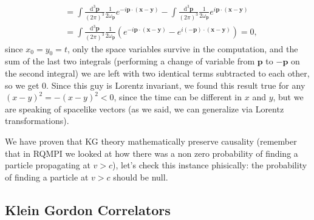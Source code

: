 \begin{enumerate}
\[\begin{aligned}
                              & = \int \frac{\mathrm{d}^3 \mathbf{p}}{(2\pi)^3} \frac{1}{2\omega_{\mathbf{p}}} e^{-i \mathbf{p} \cdot (\mathbf{x}-\mathbf{y})} - \int \frac{\mathrm{d}^3 \mathbf{p}}{(2\pi)^3} \frac{1}{2\omega_{\mathbf{p}}} e^{i \mathbf{p} \cdot (\mathbf{x}-\mathbf{y})} \\
                              & = \int \frac{\mathrm{d}^3 \mathbf{p}}{(2\pi)^3} \frac{1}{2\omega_{\mathbf{p}}} \left( e^{-i \mathbf{p} \cdot (\mathbf{x}-\mathbf{y})} - e^{i (-\mathbf{p}) \cdot (\mathbf{x}-\mathbf{y})} \right) = 0,
              \end{aligned}
          \]
          since \(x_0 = y_0 = t\), only the space variables survive in the computation, and the sum of the last two integrals (performing a change of variable from \(\mathbf{p}\) to \(-\mathbf{p}\) on the second integral) we are left with two identical terms subtracted to each other, so we get \(0\). Since this guy is Lorentz invariant, we found this result true for any \((x-y)^2 = - (x-y)^2 < 0\), since the time can be different in \(x\) and \(y\), but we are speaking of spacelike vectors (as we said, we can generalize via Lorentz transformations).
\end{enumerate}

We have proven that KG theory mathematically preserve causality (remember that in RQMPI we looked at how there was a non zero probability of finding a particle propagating at \(v>c\)), let's check this instance phisically: the probability of finding a particle at \(v>c\) should be null.

\subsection{Klein Gordon Correlators}

